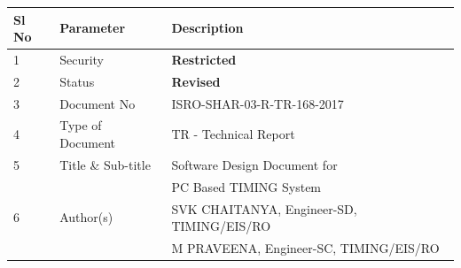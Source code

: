 \documentclass[a4paper, 12pt, oneside]{Thesis}  %
\begin{document}
	
	\vspace*{24pt}
	
	\begin{table}[h]
		\centering
		\label{TAB:Certificate}
		\begin{tabular}{@{}lll@{}}
			\toprule
			\textbf{Sl No} & \textbf{Parameter}           & \textbf{Description}                           \\ \midrule
			1              & Security                     & \textbf{Restricted}                            \\
			2              & Status                       & \textbf{Revised}                                   \\
			3              & Document No                  & ISRO-SHAR-03-R-TR-168-2017                              \\
			4              & Type of Document             & TR - Technical Report                          \\
			5              & Title \& Sub-title           & Software Design Document for \\
			&                              & PC Based TIMING System           \\
			6              & Author(s)                    & SVK CHAITANYA, Engineer-SD, TIMING/EIS/RO \newline    \\
			&                              & M PRAVEENA, Engineer-SC, TIMING/EIS/RO           \\
			                             

\end{tabular}
\end{table}
\end{document}
